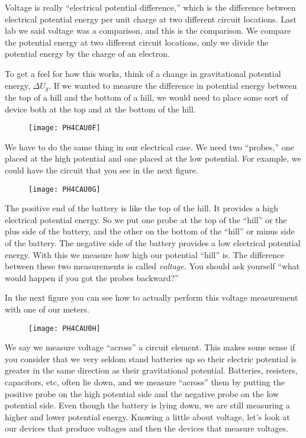 Voltage is really ``electrical potential difference,'' which is the difference between electrical potential energy per unit charge at two different circuit locations. Last lab we said voltage was a comparison, and this is the comparison. We compare the potential energy at two different circuit locations, only we divide the potential energy by the charge of an electron.

To get a feel for how this works, think of a change in gravitational potential energy, $\Delta U_{g}$. If we wanted to measure the difference in potential energy between the top of a hill and the bottom of a hill, we would need to place some sort of device both at the top and at the bottom of the hill. 
\begin{figure}[h!]
	\centering
	\texttt{[image: PH4CAU0F]}
\end{figure}

We have to do the same thing in our electrical case. We need two ``probes,'' one placed at the high potential and one placed at the low potential. For example, we could have the circuit that you see in the next figure.

\begin{figure}[h!]
	\centering
	\texttt{[image: PH4CAU0G]}
\end{figure}

The positive end of the battery is like the top of the hill. It provides a high electrical potential energy. So we put one probe at the top of the ``hill'' or the plus side of the battery, and the other on the bottom of the ``hill'' or minus side of the battery. The negative side of the battery provides a low electrical potential energy. With this we measure how high our potential ``hill'' is. The difference between these two measurements is called \emph{voltage.} You should ask yourself ``what would happen if you got the probes backward?''

In the next figure you can see how to actually perform this voltage measurement with one of our meters.

\begin{figure}[h!]
	\centering
    \texttt{[image: PH4CAU0H]}
\end{figure}

We say we measure voltage ``across'' a circuit element. This makes some sense if you consider that we very seldom stand batteries up so their electric potential is greater in the same direction as their gravitational potential. Batteries, resisters, capacitors, etc, often lie down, and we measure ``across'' them by putting the positive probe on the high potential side and the negative probe on the low potential side. Even though the battery is lying down, we are still measuring a higher and lower potential energy. Knowing a little about voltage, let's look at our devices that produce voltages and then the devices that measure voltages.

